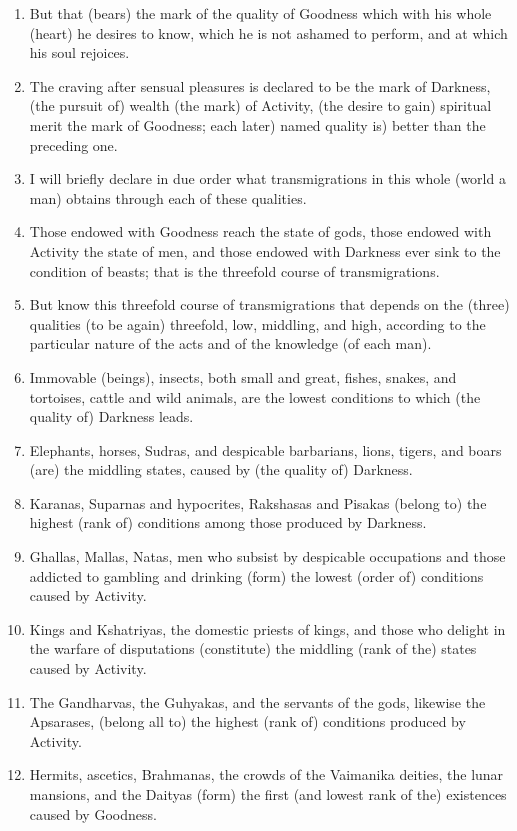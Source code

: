 \begin{enumerate}
\item But that (bears) the mark of the quality of Goodness which with his whole (heart) he desires to know, which he is not ashamed to perform, and at which his soul rejoices.
\item The craving after sensual pleasures is declared to be the mark of Darkness, (the pursuit of) wealth (the mark) of Activity, (the desire to gain) spiritual merit the mark of Goodness; each later) named quality is) better than the preceding one.
\item I will briefly declare in due order what transmigrations in this whole (world a man) obtains through each of these qualities.
\item Those endowed with Goodness reach the state of gods, those endowed with Activity the state of men, and those endowed with Darkness ever sink to the condition of beasts; that is the threefold course of transmigrations.
\item But know this threefold course of transmigrations that depends on the (three) qualities (to be again) threefold, low, middling, and high, according to the particular nature of the acts and of the knowledge (of each man).
\item Immovable (beings), insects, both small and great, fishes, snakes, and tortoises, cattle and wild animals, are the lowest conditions to which (the quality of) Darkness leads.
\item Elephants, horses, Sudras, and despicable barbarians, lions, tigers, and boars (are) the middling states, caused by (the quality of) Darkness.
\item Karanas, Suparnas and hypocrites, Rakshasas and Pisakas (belong to) the highest (rank of) conditions among those produced by Darkness.
\item Ghallas, Mallas, Natas, men who subsist by despicable occupations and those addicted to gambling and drinking (form) the lowest (order of) conditions caused by Activity.
\item Kings and Kshatriyas, the domestic priests of kings, and those who delight in the warfare of disputations (constitute) the middling (rank of the) states caused by Activity.
\item The Gandharvas, the Guhyakas, and the servants of the gods, likewise the Apsarases, (belong all to) the highest (rank of) conditions produced by Activity.
\item Hermits, ascetics, Brahmanas, the crowds of the Vaimanika deities, the lunar mansions, and the Daityas (form) the first (and lowest rank of the) existences caused by Goodness.

\end{enumerate}
